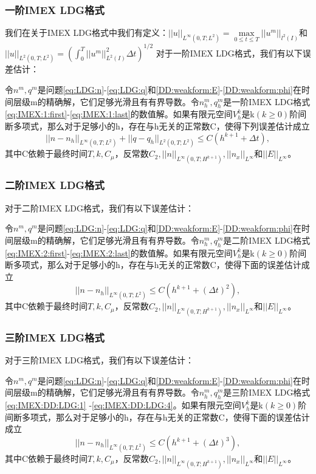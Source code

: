 \subsubsection{一阶IMEX LDG格式}
我们在关于IMEX LDG格式中我们有定义：$||u||_{L^{\infty}(0,T;L^2)}  = \max \limits_{0 \leq t \leq T}||u^m||_{l^2(I)}$和$||u||_{L^2(0,T;L^2)} = (\int_{0}^{T}||u^m||_{L^2(I)}^2\Delta t)^{1/2}$
对于一阶IMEX LDG格式，我们有以下误差估计\cite{liu2016analysis}：
\begin{theorem}
    令$n^m,q^m$是问题\eqref{eq:LDG:n}-\eqref{eq:LDG:q}和\eqref{DD:weakform:E}-\eqref{DD:weakform:phi}在时间层级m的精确解，它们足够光滑且有有界导数。令$n_h^m,q_h^m$是一阶IMEX LDG格式\eqref{eq:IMEX:1:first}-\eqref{eq:IMEX:1:last}的数值解。如果有限元空间$V_h^k$是k$(k\geq  0)$阶间断多项式，那么对于足够小的h，存在与h无关的正常数C，使得下列误差估计成立
    \begin{equation}
        ||n-n_h||_{L^{\infty}(0,T;L^2)} + ||q - q_h||_{L^2(0,T;L^2)} \leq C(h^{k+1} + \Delta t), \label{eq:IMEX:es:2}
    \end{equation}
    其中C依赖于最终时间$T,k,C_{\mu}$，反常数$C_2, ||n||_{L^{\infty}(0,T;H^{k+1})}, ||n_x||_{L^{\infty}}$和$||E||_{L^{\infty}}$。
\end{theorem}
\subsubsection{二阶IMEX LDG格式}
对于二阶IMEX LDG格式，我们有以下误差估计\cite{liu2016analysis}：
\begin{theorem}
    令$n^m,q^m$是问题\eqref{eq:LDG:n}-\eqref{eq:LDG:q}和\eqref{DD:weakform:E}-\eqref{DD:weakform:phi}在时间层级m的精确解，它们足够光滑且有有界导数。令$n_h^m,q_h^m$是二阶IMEX LDG格式\eqref{eq:IMEX:2:first}-\eqref{eq:IMEX:2:last}的数值解。如果有限元空间$V_h^k$是k$(k\geq  0)$阶间断多项式，那么对于足够小的h，存在与h无关的正常数C，使得下面的误差估计成立
    \begin{equation}
        ||n-n_h||_{L^{\infty}(0,T;L^2)} \leq C(h^{k+1} + (\Delta t)^2), \label{eq:IMEX:es:2}
    \end{equation}
    其中C依赖于最终时间$T,k,C_{\mu}$，反常数$C_2, ||n||_{L^{\infty}(0,T;H^{k+1})}, ||n_x||_{L^{\infty}}$和$||E||_{L^{\infty}}$。
\end{theorem}
\subsubsection{三阶IMEX LDG格式}
对于三阶IMEX LDG格式，我们有以下误差估计\cite{liu2016analysis}：
\begin{theorem}
    令$n^m,q^m$是问题\eqref{eq:LDG:n}-\eqref{eq:LDG:q}和\eqref{DD:weakform:E}-\eqref{DD:weakform:phi}在时间层级m的精确解，它们足够光滑且有有界导数。令$n_h^m,q_h^m$是三阶IMEX LDG格式\eqref{eq:IMEX:DD:LDG:1} -\eqref{eq:IMEX:DD:LDG:4}。如果有限元空间$V_h^k$是k$(k\geq  0)$阶间断多项式，那么对于足够小的h，存在与h无关的正常数C，使得下面的误差估计成立
    \begin{equation}
        ||n-n_h||_{L^{\infty}(0,T;L^2)} \leq C(h^{k+1} + (\Delta t)^3), \label{eq:IMEX:es:3}
    \end{equation}
    其中C依赖于最终时间$T,k,C_{\mu}$，反常数$C_2, ||n||_{L^{\infty}(0,T;H^{k+1})}, ||n_x||_{L^{\infty}}$和$||E||_{L^{\infty}}$。
\end{theorem}
